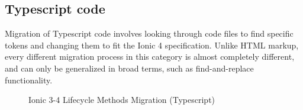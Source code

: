 \documentclass[conference]{IEEEtran}
\begin{document}
\subsection{Typescript code}
Migration of Typescript code involves looking through code files
to find specific tokens and changing them to fit the Ionic 4 specification.
Unlike HTML markup, every different migration process in this category is almost
completely different, and can only be generalized in broad terms, such as find-and-replace
functionality.
\begin{figure}[!htb]
    \centering
    \qquad
    \caption{Ionic 3-4 Lifecycle Methods Migration (Typescript)}
    \label{fig:ionicLifecycleMigration}
\end{figure}
\end{document}

